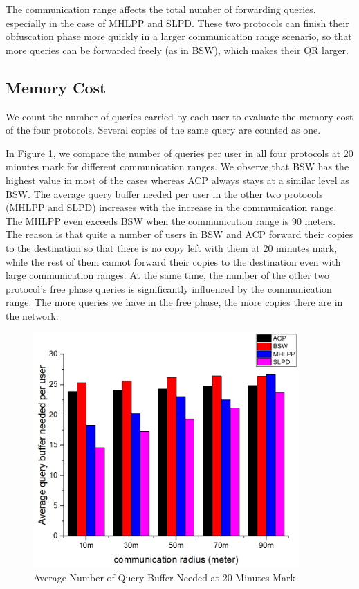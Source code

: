 The communication range affects the total number of forwarding queries, especially in the case of MHLPP and SLPD. These two protocols can finish their obfuscation phase more quickly in a larger communication range scenario, so that more queries can be forwarded freely (as in BSW), which makes their QR larger.

\subsection{ Memory Cost}

\noindent We count the number of queries carried by each user to evaluate the memory cost of the four protocols. Several copies of the same query are counted as one.

In Figure \ref{fig:F419AverageQueryBufferNeededAt20Minutes}, we compare the number of queries per user in all four protocols at 20 minutes mark for different communication ranges. We observe that BSW has the highest value in most of the cases whereas ACP always stays at a similar level as BSW. The average query buffer needed per user in the other two protocols (MHLPP and SLPD) increases with the increase in the communication range. The MHLPP even exceeds BSW when the communication range is 90 meters. The reason is that quite a number of users in BSW and ACP forward their copies to the destination so that there is no copy left with them at 20 minutes mark, while the rest of them cannot forward their copies to the destination even with large communication ranges. At the same time, the number of the other two protocol's free phase queries is significantly influenced by the communication range. The more queries we have in the free phase, the more copies there are in the network.

\begin{figure} [hbtp]
\centering 
\includegraphics[width=4.0in]{figures/F419AverageQueryBufferNeededAt20Minutes.png}
\caption{Average Number of Query Buffer Needed at 20 Minutes Mark} 
\label{fig:F419AverageQueryBufferNeededAt20Minutes} %
\end{figure}

